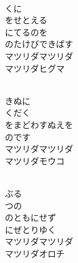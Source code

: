 \documentclass[10pt,b5j]{tarticle} %
\begin{document}
\vspace{1.5em} %
\newcommand{\linespace}{0.5em} %
\newcommand{\blocksize}{0.5\hsize} %
\newcommand{\itemmargin}{3em} %
\begin{enumerate} %
    \setlength{\itemindent}{\itemmargin} %
    \begin{minipage}[c]{\blocksize}
    
        \vspace{\linespace}
        \item~\\
        くに\\
        をせとえる\\
        にてるのを\\
        のたけびできばす\\
        マツリダマツリダ\\
        マツリダヒグマ
        
    \end{minipage}
    \begin{minipage}[c]{\blocksize}
        
        \vspace{\linespace}
        \item~\\
        きぬに\\
        くだく\\
        をまどわすぬえを\\
        のです\\
        マツリダマツリダ\\
        マツリダモウコ
        
    \end{minipage}
    \begin{minipage}[c]{\blocksize}
        
        \vspace{\linespace}
        \item~\\
        ぶる\\
        つの\\
        のともにせず\\
        にぜとりゆく\\
        マツリダマツリダ\\
        マツリダオロチ
        

\end{minipage}
\end{enumerate}
\end{document}
